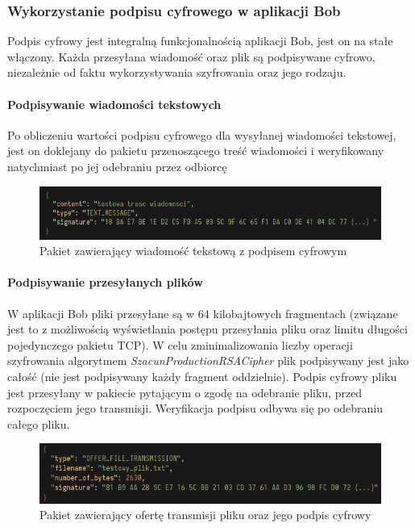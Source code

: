 \documentclass{article}
\begin{document}
      \subsubsection{Wykorzystanie podpisu cyfrowego w aplikacji Bob}
        Podpis cyfrowy jest integralną funkcjonalnością aplikacji Bob, jest on na stałe włączony. Każda przesyłana
        wiadomość oraz plik są podpisywane cyfrowo, niezależnie od faktu wykorzystywania szyfrowania oraz jego rodzaju.

        \paragraph{Podpisywanie wiadomości tekstowych}
          Po obliczeniu wartości podpisu cyfrowego dla wysyłanej wiadomości tekstowej, jest on doklejany do pakietu
          przenoszącego treść wiadomości i weryfikowany natychmiast po jej odebraniu przez odbiorcę

          \begin{figure}[H]
              \centering
              \includegraphics[scale=0.7]{pakiet_z_wiadomoscia_z_podpisem}
              \caption{Pakiet zawierający wiadomość tekstową z podpisem cyfrowym}
              \label{MESSAGE_WITH_SIGNATURE_PACKET}
          \end{figure}

        \paragraph{Podpisywanie przesyłanych plików}
          W aplikacji Bob pliki przesyłane są w 64 kilobajtowych fragmentach (związane jest to z możliwością wyświetlania
          postępu przesyłania pliku oraz limitu długości pojedynczego pakietu TCP). W celu zminimalizowania liczby operacji
          szyfrowania algorytmem \emph{SzacunProductionRSACipher} plik podpisywany jest jako całość (nie jest podpisywany
          każdy fragment oddzielnie). Podpis cyfrowy pliku jest przesyłany w pakiecie pytającym o zgodę na odebranie pliku,
          przed rozpoczęciem jego transmisji. Weryfikacja podpisu odbywa się po odebraniu całego pliku.

          \begin{figure}[H]
              \centering
              \includegraphics[scale=0.7]{oferta_transmisji_pliku_z_podpisem}
              \caption{Pakiet zawierający ofertę transmisji pliku oraz jego podpis cyfrowy}
              \label{PACKET_WITH_FILE_TRANSMISSION_OFFER_AND_SIGNATURE}
          \end{figure}
\end{document}
